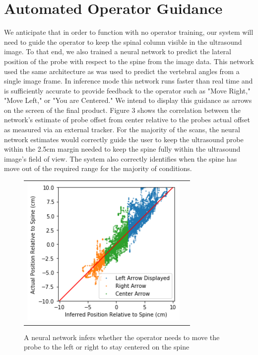 \documentclass{article}
\begin{document}
\section{Automated Operator Guidance}
We anticipate that in order to function with no operator training, our system will need to guide the operator to keep the spinal column visible in the ultrasound image. To that end, we also trained a neural network
to predict the lateral position of the probe with respect to the spine from the image data. This network used the same architecture as was used to predict the vertebral angles from a single image frame. In inference mode this network runs faster than real time and is sufficiently accurate to provide feedback to the operator such as "Move Right," "Move Left," or "You are Centered." We intend to display this guidance as arrows on the screen of the final product.  Figure 3 shows the correlation between the network's estimate of probe offset from center relative to the probes actual offset as measured via an external tracker.  For the majority of the scans, the neural network estimates would correctly guide the user to keep the ultrasound probe within the 2.5cm margin needed to keep the spine fully within the ultrasound image's field of view. The system also correctly identifies when the spine has move out of the required range for the majority of conditions.

\begin{figure}
\centering
\begin{tabular}{cc}
\centering
\includegraphics[height=7.4cm,keepaspectratio]{Guidance}
\end{tabular}
\caption{A neural network infers whether the operator needs to move the probe to the left or right to stay centered on the spine
}
\end{figure}
\end{document}
